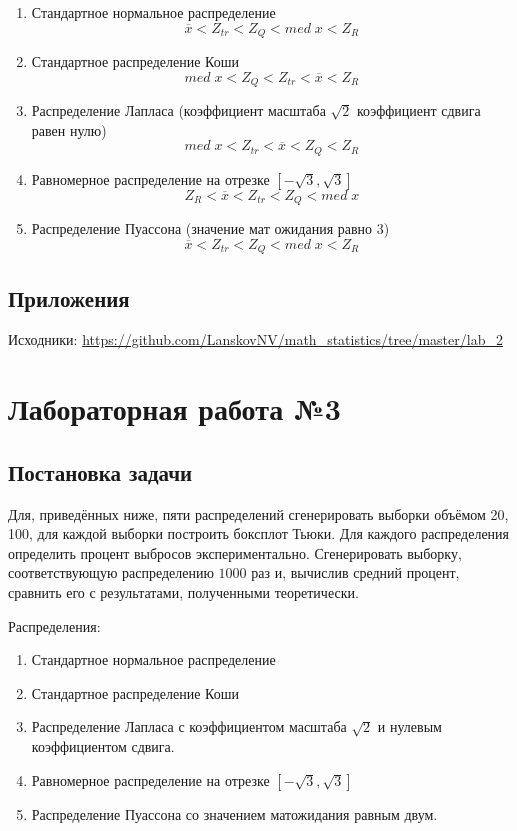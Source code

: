 \documentclass[12pt]{report}
\begin{document}
\begin{enumerate}
    \item Стандартное нормальное распределение $$\overline{x} < Z_{tr} < Z_Q < med\;x < Z_R$$
    
    \item Стандартное распределение Коши $$med\;x < Z_Q < Z_{tr} < \overline{x} < Z_R$$
    
    \item Распределение Лапласа (коэффициент масштаба $\sqrt{2}$ коэффициент сдвига равен нулю) $$med\;x < Z_{tr} < \overline{x} < Z_Q < Z_R$$
    
    \item Равномерное распределение на отрезке $\left[-\sqrt{3},\sqrt{3}\right]$ $$Z_R < \overline{x} < Z_{tr} < Z_Q < med\;x$$
    
    \item Распределение Пуассона (значение мат ожидания равно $3$) $$\overline{x} < Z_{tr} < Z_Q < med\;x < Z_R$$
    
\end{enumerate}

\section{Приложения}

Исходники: \url{https://github.com/LanskovNV/math_statistics/tree/master/lab_2}

\newpage

\chapter{Лабораторная работа №3}
\section{Постановка задачи}
Для, приведённых ниже, пяти распределений сгенерировать выборки объёмом 20, 100, для каждой выборки построить боксплот Тьюки. Для каждого распределения определить процент выбросов экспериментально. Сгенерировать выборку, соответствующую распределению $1000$ раз и, вычислив средний процент, сравнить его с результатами, полученными теоретически.

Распределения:
\begin{enumerate}
\item Стандартное нормальное распределение
\item Стандартное распределение Коши
\item Распределение Лапласа с коэффициентом масштаба $\sqrt{2}$ и нулевым коэффициентом сдвига.
\item Равномерное распределение на отрезке $\left[-\sqrt{3}, \sqrt{3}\right]$
\item Распределение Пуассона со значением матожидания равным двум.
\end{enumerate}
\end{document}
